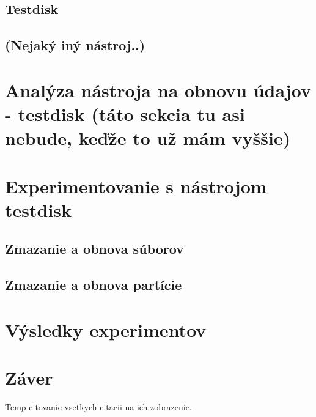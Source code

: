 \documentclass[12pt,oneside,slovak,a4paper]{article}
\begin{document}
\subsection{Testdisk}
\subsection{(Nejaký iný nástroj..)}

\section{Analýza nástroja na obnovu údajov - testdisk (táto sekcia tu asi nebude, keďže to už mám vyššie)}

\section{Experimentovanie s nástrojom testdisk}
\subsection{Zmazanie a obnova súborov}
\subsection{Zmazanie a obnova partície}

\section{Výsledky experimentov}

\section{Záver}
Temp citovanie vsetkych citacii na ich zobrazenie.\cite{TSDK,NTFS,NTFS2,NTFS3,NTFS4,FAT,EXT,ALLFS}




\end{document}
